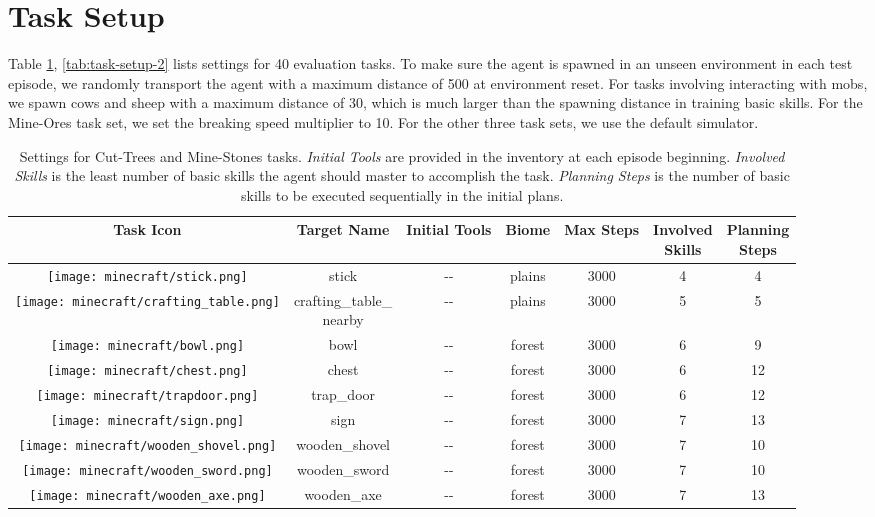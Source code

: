 \documentclass{article}
\newcommand{\mcbowl}{\texttt{[image: minecraft/bowl.png]}}
\newcommand{\mcchest}{\texttt{[image: minecraft/chest.png]}}
\newcommand{\mccraftingtable}{\texttt{[image: minecraft/crafting\_table.png]}}
\newcommand{\mcsign}{\texttt{[image: minecraft/sign.png]}}
\newcommand{\mcstick}{\texttt{[image: minecraft/stick.png]}}
\newcommand{\mctrapdoor}{\texttt{[image: minecraft/trapdoor.png]}}
\newcommand{\mcwoodenaxe}{\texttt{[image: minecraft/wooden\_axe.png]}}
\newcommand{\mcwoodenshovel}{\texttt{[image: minecraft/wooden\_shovel.png]}}
\newcommand{\mcwoodensword}{\texttt{[image: minecraft/wooden\_sword.png]}}
\begin{document}
\section{Task Setup}
\label{appendix:task-setup}

Table \ref{tab:task-setup}, \ref{tab:task-setup-2} lists settings for 40 evaluation tasks. To make sure the agent is spawned in an unseen environment in each test episode, we randomly transport the agent with a maximum distance of 500 at environment reset. For tasks involving interacting with mobs, we spawn cows and sheep with a maximum distance of 30, which is much larger than the spawning distance in training basic skills. For the Mine-Ores task set, we set the breaking speed multiplier to 10. For the other three task sets, we use the default simulator.

\begin{table}[htbp]
  \caption{Settings for Cut-Trees and Mine-Stones tasks. \textit{Initial Tools} are provided in the inventory at each episode beginning. \textit{Involved Skills} is the least number of basic skills the agent should master to accomplish the task. \textit{Planning Steps} is the number of basic skills to be executed sequentially in the initial plans. }
  \label{tab:task-setup}
  \centering
  \begin{tabular}{ccccccc}
    \toprule
    Task Icon  & Target Name & Initial Tools & Biome & Max Steps & \makecell{Involved\\Skills} & \makecell{Planning\\Steps} \\
    \midrule
    \mcstick  & stick & \--\-- & plains & 3000 & 4 & 4  \\
    \mccraftingtable &  \makecell{crafting\_table\_ \\ nearby} & \--\-- & plains & 3000 & 5 & 5 \\
    \mcbowl  &  bowl & \--\-- & forest & 3000 & 6 & 9 \\
    \mcchest   & chest  & \--\-- & forest & 3000 & 6 & 12  \\
    \mctrapdoor  & trap\_door  & \--\-- & forest & 3000 & 6 & 12  \\
    \mcsign  &  sign & \--\-- & forest & 3000 & 7 & 13  \\
    \mcwoodenshovel  &  wooden\_shovel & \--\-- & forest & 3000 & 7 & 10 \\
    \mcwoodensword  &  wooden\_sword & \--\-- & forest & 3000 & 7 & 10  \\
    \mcwoodenaxe  &  wooden\_axe & \--\-- & forest & 3000 & 7 & 13  \\

\end{tabular}
\end{table}
\end{document}
